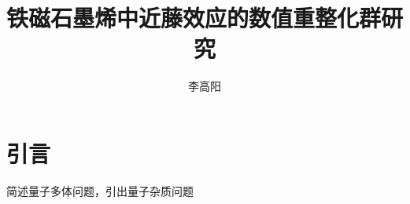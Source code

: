 \documentclass[twoside]{LZUthesis}
\begin{document}
\classification{}

\confidential{}

\title{铁磁石墨烯中近藤效应的数值重整化群研究}


\englishtitle{}


\author{李高阳}






\submitdate{}


\degreedate{}


\maketitle

\makestatement

\frontmatter{}

\begin{abstract}
\end{abstract}

\keywords{}

\begin{englishabstract}
\end{englishabstract}

\englishkeywords{}

\tableofcontents{}


\mainmatter

\pagestyle{lzu}

\chapter{引言\label{chap:intro}}
简述量子多体问题，引出量子杂质问题
\end{document}
